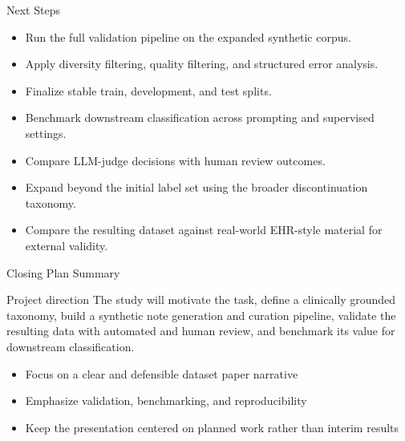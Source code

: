 \documentclass[aspectratio=169]{beamer}
\begin{document}
\begin{frame}{Next Steps}
    \begin{itemize}
        \item Run the full validation pipeline on the expanded synthetic corpus.
        \item Apply diversity filtering, quality filtering, and structured error analysis.
        \item Finalize stable train, development, and test splits.
        \item Benchmark downstream classification across prompting and supervised settings.
        \item Compare LLM-judge decisions with human review outcomes.
        \item Expand beyond the initial label set using the broader discontinuation taxonomy.
        \item Compare the resulting dataset against real-world EHR-style material for external validity.
    \end{itemize}
\end{frame}

\begin{frame}{Closing Plan Summary}
    \begin{block}{Project direction}
        The study will motivate the task, define a clinically grounded taxonomy, build a synthetic note generation and curation pipeline, validate the resulting data with automated and human review, and benchmark its value for downstream classification.
    \end{block}

    \vspace{0.5em}
    \begin{itemize}
        \item Focus on a clear and defensible dataset paper narrative
        \item Emphasize validation, benchmarking, and reproducibility
        \item Keep the presentation centered on planned work rather than interim results
    \end{itemize}
\end{frame}
\end{document}
